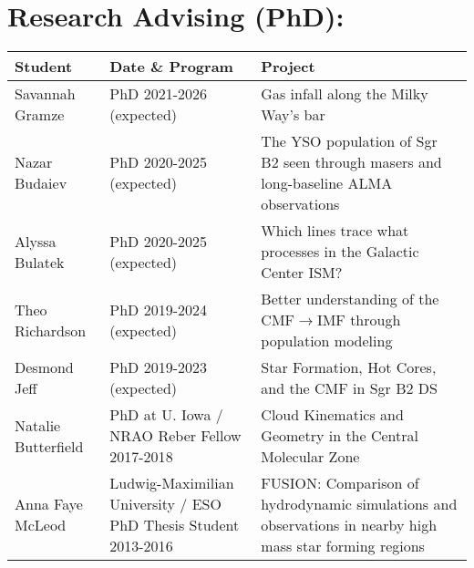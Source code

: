 \begin{minipage}{\textwidth}
\setlength{\extrarowheight}{4pt}
\section*{Research Advising (PhD): }
\vspace{-12pt}
\begin{tabular}{lp{2.1in}p{2.6in}}
    Student & Date  \& Program &   Project \\
    \hline
    Savannah Gramze     &  PhD 2021-2026 (expected) &                                     Gas infall along the Milky Way's bar \\
    Nazar Budaiev       &  PhD 2020-2025 (expected) &                                    The YSO population of Sgr B2 seen through masers and long-baseline ALMA observations  \\
    Alyssa Bulatek      &  PhD 2020-2025 (expected) &                                    Which lines trace what processes in the Galactic Center ISM?  \\
    Theo Richardson     &  PhD 2019-2024 (expected)  &                                   Better understanding of the CMF$\rightarrow$IMF through population modeling  \\
    Desmond Jeff        &  PhD 2019-2023 (expected)  &                                    Star Formation, Hot Cores, and the CMF in Sgr B2 DS \\
    Natalie Butterfield &  PhD at U. Iowa / NRAO Reber Fellow 2017-2018   &                     Cloud Kinematics and Geometry in the Central Molecular Zone \\
    Anna Faye McLeod    &  Ludwig-Maximilian University / ESO PhD Thesis Student 2013-2016  &  FUSION: Comparison of hydrodynamic simulations and observations in nearby high mass star forming regions  \\
\end{tabular}
\end{minipage}


